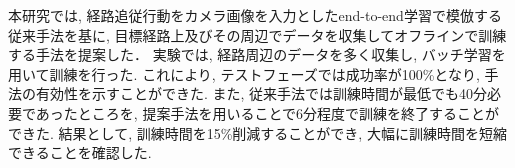 
本研究では, 経路追従行動をカメラ画像を入力としたend-to-end学習で模倣する従来手法を基に, 目標経路上及びその周辺でデータを収集してオフラインで訓練する手法を提案した． 実験では, 経路周辺のデータを多く収集し, バッチ学習を用いて訓練を行った. これにより, テストフェーズでは成功率が100\%となり, 手法の有効性を示すことができた. また, 従来手法では訓練時間が最低でも40分必要であったところを, 提案手法を用いることで6分程度で訓練を終了することができた. 結果として, 訓練時間を15\%削減することができ, 大幅に訓練時間を短縮できることを確認した.  
